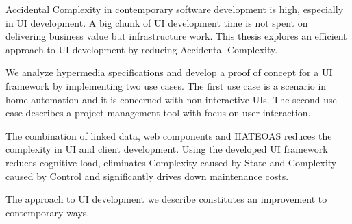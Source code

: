 Accidental Complexity in contemporary software development is high, especially in UI development. A big chunk of UI development time is not spent on delivering business value but infrastructure work. This thesis explores an efficient approach to UI development by reducing Accidental Complexity.

We analyze hypermedia specifications and develop a proof of concept for a UI framework by implementing two use cases. The first use case is a scenario in home automation and it is concerned with non-interactive UIs. The second use case describes a project management tool with focus on user interaction.

The combination of linked data, web components and HATEOAS reduces the complexity in UI and client development. Using the developed UI framework reduces cognitive load, eliminates Complexity caused by State and Complexity caused by Control and significantly drives down maintenance costs.

The approach to UI development we describe constitutes an improvement to contemporary ways.
